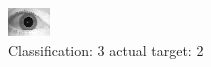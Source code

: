 \begin{figure}[h!]
\begin{center}
\includegraphics[width=0.60\columnwidth]{figures/ID1716_class_3_target_2.png}
\end{center}
\caption{ Classification: 3 actual target: 2}
\label{fig:ID1716_class_3_target_2}
\end{figure}
